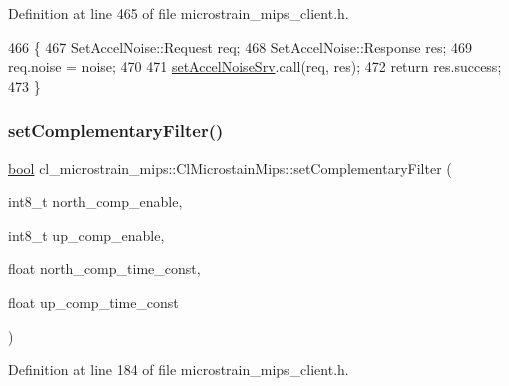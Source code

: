 Definition at line 465 of file microstrain\+\_\+mips\+\_\+client.\+h.


\begin{DoxyCode}
466     \{
467         SetAccelNoise::Request req;
468         SetAccelNoise::Response res;
469         req.noise = noise;
470 
471         \hyperlink{classcl__microstrain__mips_1_1ClMicrostainMips_aed9dd96ff81966ea1fce03173a05bcd8}{setAccelNoiseSrv}.call(req, res);
472         \textcolor{keywordflow}{return} res.success;
473     \}
\end{DoxyCode}
\mbox{\label{classcl__microstrain__mips_1_1ClMicrostainMips_a4dfbed2e601dd990b5fd89fb670656b9}} 
\subsubsection{\texorpdfstring{set\+Complementary\+Filter()}{setComplementaryFilter()}}
{\footnotesize\ttfamily \hyperlink{classbool}{bool} cl\+\_\+microstrain\+\_\+mips\+::\+Cl\+Microstain\+Mips\+::set\+Complementary\+Filter (\begin{DoxyParamCaption}\item[{int8\+\_\+t}]{north\+\_\+comp\+\_\+enable,  }\item[{int8\+\_\+t}]{up\+\_\+comp\+\_\+enable,  }\item[{float}]{north\+\_\+comp\+\_\+time\+\_\+const,  }\item[{float}]{up\+\_\+comp\+\_\+time\+\_\+const }\end{DoxyParamCaption})\hspace{0.3cm}{\ttfamily [inline]}}



Definition at line 184 of file microstrain\+\_\+mips\+\_\+client.\+h.


